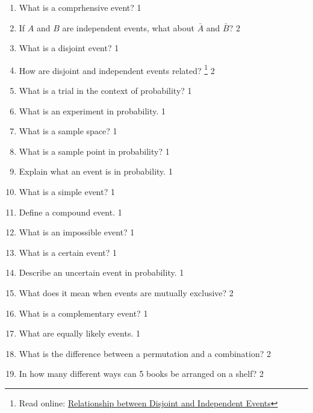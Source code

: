 \documentclass[a4paper,oneside, margin=1.4in]{book}
\begin{document}
 \begin{enumerate}
 
 \item What is a comprhensive event? \hfill 1
 \item If $A$ and $B$ are independent events, what about $\bar A$ and $\bar B$? \hfill 2
    \item
	What is a disjoint event? \hfill 1
    \item
	How are disjoint and independent events related? \footnote{Read online: \href{https://study.statmania.info/disjint-independent-relation.sm}{Relationship between Disjoint and Independent Events}}  \hfill 2

 
    \item What is a trial in the context of probability? \hfill 1

\item What is an experiment in probability. \hfill 1

\item What is a sample space? \hfill 1

\item What is a sample point in probability? \hfill 1

\item Explain what an event is in probability. \hfill 1

\item What is a simple event? \hfill 1

\item Define a compound event. \hfill 1

\item What is an impossible event? \hfill 1

\item What is a certain event? \hfill 1

\item Describe an uncertain event in probability. \hfill 1

\item What does it mean when events are mutually exclusive? \hfill 2

\item What is a complementary event? \hfill 1

\item What are equally likely events. \hfill 1

\item What is the difference between a permutation and a combination? \hfill 2

\item In how many different ways can 5 books be arranged on a shelf? \hfill 2


\end{enumerate}
\end{document}
